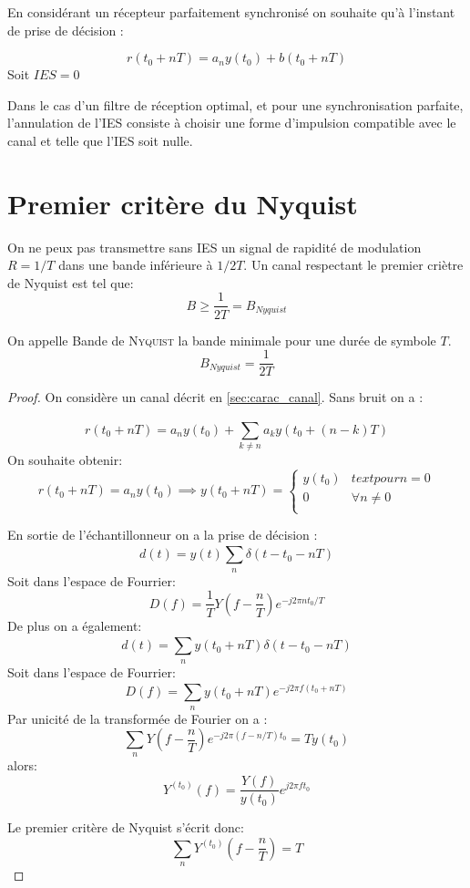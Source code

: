 \documentclass[main.tex]{subfiles}
\begin{document}
\begin{prop}
  En considérant un récepteur parfaitement synchronisé on souhaite qu'à l'instant de prise de décision :

\[
  r(t_0+nT)  = a_n y(t_0)+ b(t_0+nT)
\]
Soit $IES = 0 $
\end{prop}

\begin{rem}
  Dans le cas d'un filtre de réception optimal, et pour une synchronisation parfaite, l'annulation de l'IES consiste à choisir une forme d'impulsion compatible avec le canal et telle que l'IES soit nulle.
\end{rem}
\section{Premier critère  du Nyquist}

\begin{thm}
  On ne peux pas transmettre sans IES un signal de rapidité de modulation $R = 1/T$ dans une bande inférieure à $1/2T$.
  Un canal respectant le premier criètre de Nyquist est tel que:
  \[
    B \ge \frac{1}{2T} = B_{Nyquist}
  \]
\end{thm}
\begin{defin}
  On appelle Bande de \textsc{Nyquist} la bande minimale pour une durée de symbole $T$.
  \[
    B_{Nyquist} = \frac{1}{2T}
  \]
\end{defin}

\begin{proof}
  On considère un canal décrit en \ref{sec:carac_canal}. Sans bruit on a :

  \[
    r(t_0+nT) = a_ny(t_0)+\sum_{k\neq n}^{}a_k y(t_0+(n-k)T)
  \]
  On souhaite obtenir:
  \[
    r(t_0+nT) = a_ny(t_0) \implies y(t_0+nT) =
    \begin{cases}
      y(t_0) & text{ pour } n = 0\\
      0 & \forall n \neq 0 \\
    \end{cases}
  \]

  En sortie de l'échantillonneur on a la prise de décision :
  \[
    d(t) = y(t)\sum_{n}^{}\delta(t-t_0-nT)
  \]
  Soit dans l'espace de Fourrier:
  \[
    D(f) = \frac{1}{T}Y(f-\frac{n}{T})e^{-j2\pi n t_0/T} \tag{(*)}
  \]
  De plus on a également:
   \[
     d(t) = \sum_{n}^{}y(t_0+nT)\delta(t-t_0-nT)
   \]
   Soit dans l'espace de Fourrier:
   \[
     D(f) = \sum_{n}^{}y(t_0+nT)e^{-j 2 \pi f(t_0+nT)} \tag{(**)}
   \]
   Par unicité de la transformée de Fourier on a :
   \[
     \sum_{n}^{}Y(f-\frac{n}{T}) e^{-j2\pi (f-n/T)t_0} = T y(t_0)
   \]
   alors:
   \[
     Y^{(t_0)}(f)  = \frac{Y(f)}{y(t_0)}e^{j 2 \pi f t_0}
   \]

   Le premier critère de Nyquist s'écrit donc:
   \[
     \sum_{n}^{}Y^{(t_0)}(f-\frac{n}{T}) =T 
   \]
 \end{proof}
\end{document}
